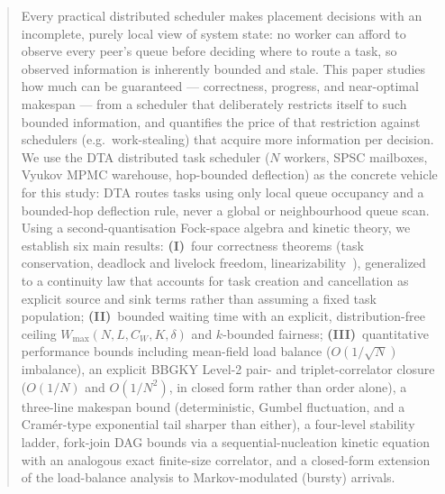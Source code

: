 \documentclass[11pt,a4paper]{report}
\begin{document}
\begin{abstract}
Every practical distributed scheduler makes placement decisions with an
incomplete, purely local view of system state: no worker can afford to
observe every peer's queue before deciding where to route a task, so
observed information is inherently bounded and stale.  This paper studies
how much can be guaranteed --- correctness, progress, and near-optimal
makespan --- from a scheduler that deliberately restricts itself to such
bounded information, and quantifies the price of that restriction against
schedulers (e.g.\ work-stealing) that acquire more information per
decision.  We use the \textsc{DTA} distributed task scheduler ($N$ workers,
SPSC mailboxes, Vyukov MPMC warehouse, hop-bounded deflection) as the
concrete vehicle for this study: DTA routes tasks using only local queue
occupancy and a bounded-hop deflection rule, never a global or
neighbourhood queue scan.  Using a second-quantisation Fock-space algebra
and kinetic theory, we establish six main results:
\textbf{(I)}~four correctness theorems (task conservation, deadlock and
livelock freedom, linearizability~\cite{herlihy_wing1990,herlihy_shavit2008}),
generalized to a continuity law that accounts for task creation and
cancellation as explicit source and sink terms rather than assuming a
fixed task population;
\textbf{(II)}~bounded waiting time with an explicit, distribution-free ceiling
$W_{\max}(N,L,C_W,K,\delta)$
and $k$-bounded fairness;
\textbf{(III)}~quantitative performance bounds including mean-field load
balance ($O(1/\sqrt{N})$ imbalance), an explicit BBGKY Level-2 pair- and
triplet-correlator closure ($O(1/N)$ and $O(1/N^2)$, in closed form
rather than order alone), a three-line makespan bound (deterministic,
Gumbel fluctuation, and a Cram\'er-type exponential tail sharper than
either), a four-level stability ladder, fork-join DAG bounds via a
sequential-nucleation kinetic equation with an analogous exact
finite-size correlator, and a closed-form extension of the load-balance
analysis to Markov-modulated (bursty) arrivals.


\end{abstract}
\end{document}
